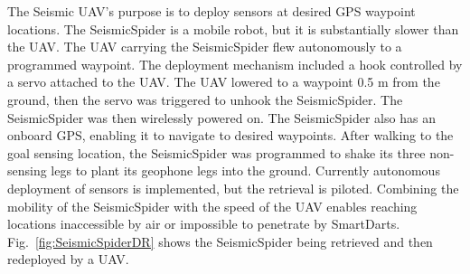 The Seismic UAV's purpose is to deploy sensors at desired GPS waypoint locations. The SeismicSpider is a mobile robot, but it is substantially slower than the UAV.  The UAV carrying the SeismicSpider flew autonomously to a programmed waypoint. The deployment mechanism included a hook controlled by a servo attached to the UAV. The UAV lowered to a waypoint 0.5 m from the ground, then the servo was triggered to unhook the SeismicSpider.  The SeismicSpider was then wirelessly powered on. 
The SeismicSpider also has an onboard GPS, enabling it to navigate to desired waypoints. 
After walking to the goal sensing location, the SeismicSpider was programmed to shake its three non-sensing legs to plant its geophone legs into the ground.  
  Currently autonomous deployment of sensors is implemented, but the retrieval is piloted. 
Combining the mobility of the SeismicSpider with the speed of the UAV enables reaching locations inaccessible by air or impossible to penetrate by SmartDarts.
Fig.~\ref{fig:SeismicSpiderDR} shows the SeismicSpider being retrieved and then redeployed by a UAV.





